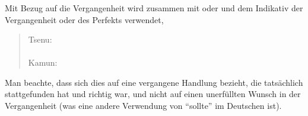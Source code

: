 \subsubsection{} Mit Bezug auf die Vergangenheit wird  zusammen mit  oder  und dem Indikativ der Vergangenheit oder des Perfekts verwendet,

\begin{quotation}
	\noindent Tsenu:  \\
	\indent{} \\
	
	\noindent Kamun: \\
	\indent{}
\end{quotation}

\noindent Man beachte, dass sich dies auf eine vergangene Handlung bezieht, die tatsächlich stattgefunden hat und richtig war, und nicht auf einen unerfüllten Wunsch in der Vergangenheit (was eine andere Verwendung von ``sollte'' im Deutschen ist).
